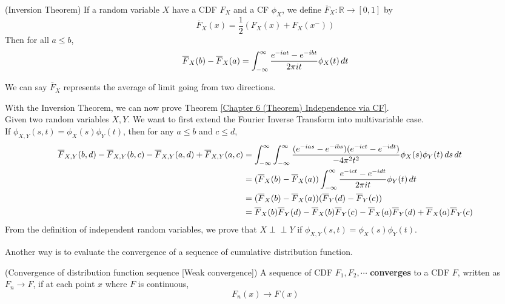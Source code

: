 \documentclass{huhtakm-template-book}
\newcommand{\independent}{\perp\!\!\!\perp}
\begin{document}
\begin{thm}(Inversion Theorem)
	If a random variable $X$ have a CDF $F_{X}$ and a CF $\phi_{X}$, we define $\overline{F}_{X}:\mathbb{R}\to[0,1]$ by
	\begin{equation*}
		\overline{F}_{X}(x)=\frac{1}{2}\left(F_{X}(x)+F_{X}(x^{-})\right)
	\end{equation*}
	Then for all $a\leq b$,
	\begin{equation*}
		\overline{F}_{X}(b)-\overline{F}_{X}(a)=\int_{-\infty}^{\infty}\frac{e^{-iat}-e^{-ibt}}{2\pi it}\phi_{X}(t)\,dt
	\end{equation*}
\end{thm}
\begin{rem}
	We can say $\overline{F}_{X}$ represents the average of limit going from two directions.
\end{rem}
\begin{eg}
	\label{Chapter 6 (Example) Proof of Independence via CF}
	With the Inversion Theorem, we can now prove Theorem \ref{Chapter 6 (Theorem) Independence via CF}.\\
	Given two random variables $X,Y$. We want to first extend the Fourier Inverse Transform into multivariable case.\\
	If $\phi_{X,Y}(s,t)=\phi_{X}(s)\phi_{Y}(t)$, then for any $a\leq b$ and $c\leq d$,
	\begin{align*}
		\overline{F}_{X,Y}(b,d)-\overline{F}_{X,Y}(b,c)-\overline{F}_{X,Y}(a,d)+\overline{F}_{X,Y}(a,c)&=\int_{-\infty}^{\infty}\int_{-\infty}^{\infty}\frac{(e^{-ias}-e^{-ibs})(e^{-ict}-e^{-idt})}{-4\pi^{2}t^{2}}\phi_{X}(s)\phi_{Y}(t)\,ds\,dt\\
		&=(\overline{F}_{X}(b)-\overline{F}_{X}(a))\int_{-\infty}^{\infty}\frac{e^{-ict}-e^{-idt}}{2\pi it}\phi_{Y}(t)\,dt\\
		&=(\overline{F}_{X}(b)-\overline{F}_{X}(a))(\overline{F}_{Y}(d)-\overline{F}_{Y}(c))\\
		&=\overline{F}_{X}(b)\overline{F}_{Y}(d)-\overline{F}_{X}(b)\overline{F}_{Y}(c)-\overline{F}_{X}(a)\overline{F}_{Y}(d)+\overline{F}_{X}(a)\overline{F}_{Y}(c)
	\end{align*}
	From the definition of independent random variables, we prove that $X\independent Y$ if $\phi_{X,Y}(s,t)=\phi_{X}(s)\phi_{Y}(t)$.
\end{eg}
\newpage
Another way is to evaluate the convergence of a sequence of cumulative distribution function.
\begin{defn}(Convergence of distribution function sequence [Weak convergence])
	A sequence of CDF 
	$F_{1},F_{2},\cdots$ \textbf{converges} to a CDF $F$, written as $F_{n}\to F$, if at each point $x$ where $F$ is continuous,
	\begin{equation*}
		F_{n}(x)\to F(x)
	\end{equation*}
\end{defn}
\end{document}
